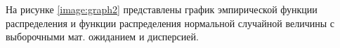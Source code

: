 На рисунке \ref{image:graph2} представлены график эмпирической функции распределения и функции распределения нормальной случайной величины с выборочными мат. ожиданием и дисперсией.
\begin{figure}[H]
\end{figure}